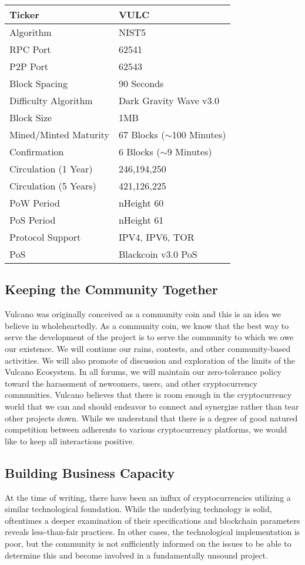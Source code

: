 \documentclass[A4paper, 12pt]{article}
\begin{document}
\begin{table}[h]
\centering
\begin{tabular}{@{}ll@{}}
\toprule
Ticker & VULC \\ \midrule
Algorithm & NIST5 \\
RPC Port & 62541 \\
P2P Port & 62543 \\
Block Spacing & 90 Seconds \\
Difficulty Algorithm & Dark Gravity Wave v3.0 \\
Block Size & 1MB \\
Mined/Minted Maturity & 67 Blocks ($\sim$100 Minutes) \\
Confirmation & 6 Blocks ($\sim$9 Minutes) \\
Circulation (1 Year) & 246,194,250 \\
Circulation (5 Years) & 421,126,225 \\
PoW Period & nHeight 60 \\
PoS Period & nHeight 61 \\
Protocol Support & IPV4, IPV6, TOR \\
PoS & Blackcoin v3.0 PoS \\ \bottomrule
\end{tabular}
\end{table}

\subsection{Keeping the Community Together}
Vulcano was originally conceived as a community coin and this is an idea we believe in wholeheartedly. As a community coin, we know that the best way to serve the development of the project is to serve the community to which we owe our existence. We will continue our rains, contests, and other community-based activities. We will also promote of discussion and exploration of the limits of the Vulcano Ecosystem. In all forums, we will maintain our zero-tolerance policy toward the harassment of newcomers, users, and other cryptocurrency communities. Vulcano believes that there is room enough in the cryptocurrency world that we can and should endeavor to connect and synergize rather than tear other projects down. While we understand that there is a degree of good natured competition between adherents to various cryptocurrency platforms, we would like to keep all interactions positive.

\subsection{Building Business Capacity}
At the time of writing, there have been an influx of cryptocurrencies utilizing a similar technological foundation. While the underlying technology is solid, oftentimes a deeper examination of their specifications and blockchain parameters reveals less-than-fair practices. In other cases, the technological implementation is poor, but the community is not sufficiently informed on the issues to be able to determine this and become involved in a fundamentally unsound project. 
\end{document}
